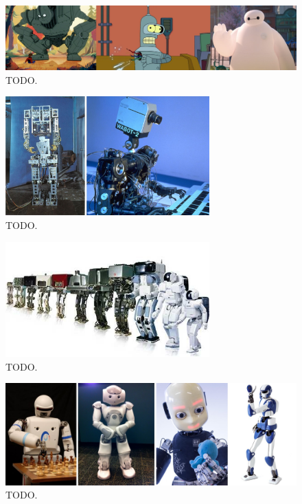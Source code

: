 \begin{figure}
    \centering
    \includegraphics[width=\textwidth]{figures/01-introduction/robots-in-animation.jpg}
    \caption{TODO.}
    \label{fig:introduction:robots-in-animation}
\end{figure}

\begin{figure}
    \centering
    \includegraphics[width=0.7\textwidth]{figures/01-introduction/WABOTs.jpg}
    \caption{TODO.}
    \label{fig:introduction:WABOTs}
\end{figure}

\begin{figure}
    \centering
    \includegraphics[width=0.7\textwidth]{figures/01-introduction/The-ASIMO-humanoid-robot-history.png}
    \caption{TODO.}
    \label{fig:introduction:ASIMO-humanoid-history}
\end{figure}

\begin{figure}
    \centering
    \includegraphics[width=\textwidth]{figures/01-introduction/robots-in-2000.jpg}
    \caption{TODO.}
    \label{fig:introduction:robots-in-2000}
\end{figure}

